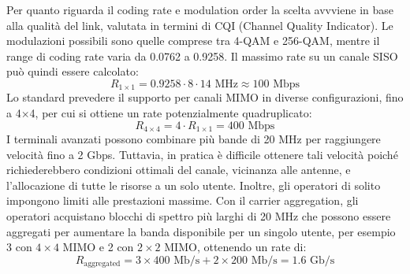 Per quanto riguarda il coding rate e modulation order la scelta avvviene in base alla qualità del link, valutata in termini di CQI (Channel Quality Indicator). Le modulazioni possibili sono quelle comprese tra 4-QAM e 256-QAM, mentre il range di coding rate varia da 0.0762 a 0.9258.
Il massimo rate su un canale SISO può quindi essere calcolato:
\[
    R_{1 \times 1} = 0.9258 \cdot 8 \cdot 14 \text{ MHz} \approx 100 \text{ Mbps}
\]
Lo standard prevedere il supporto per canali MIMO in diverse configurazioni, fino a 4$\times$4, per cui si ottiene un rate potenzialmente quadruplicato:
\[
    R_{4 \times 4} = 4 \cdot R_{1 \times 1} = 400 \text{ Mbps}
\]
I terminali avanzati possono combinare più bande di 20 MHz per raggiungere velocità fino a 2 Gbps.
Tuttavia, in pratica è difficile ottenere tali velocità poiché richiederebbero condizioni ottimali del canale, vicinanza alle antenne, e l'allocazione di tutte le risorse a un solo utente.
Inoltre, gli operatori di solito impongono limiti alle prestazioni massime. 
Con il carrier aggregation, gli operatori acquistano blocchi di spettro più larghi di 20 MHz che possono essere aggregati per aumentare la banda disponibile per un singolo utente, per esempio 3 con $4 \times 4$ MIMO e 2 con $2 \times 2$ MIMO, ottenendo un rate di:
\[
    R_{\text{aggregated}} = 3 \times 400 \text{ Mb/s} + 2 \times 200 \text{ Mb/s} = 1.6 \text{ Gb/s}
\]


